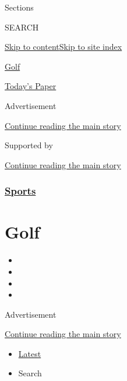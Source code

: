 Sections

SEARCH

\protect\hyperlink{site-content}{Skip to
content}\protect\hyperlink{site-index}{Skip to site index}

\href{https://www.nytimes3xbfgragh.onion/section/sports/golf}{Golf}

\href{https://myaccount.nytimes3xbfgragh.onion/auth/login?response_type=cookie\&client_id=vi}{}

\href{https://www.nytimes3xbfgragh.onion/section/todayspaper}{Today's
Paper}

Advertisement

\protect\hyperlink{after-top}{Continue reading the main story}

Supported by

\protect\hyperlink{after-sponsor}{Continue reading the main story}

\hypertarget{sports}{%
\subsubsection{\texorpdfstring{\href{/section/sports}{Sports}}{Sports}}\label{sports}}

\hypertarget{golf}{%
\section{Golf}\label{golf}}

\begin{itemize}
\item
\item
\item
\item
\end{itemize}

Advertisement

\protect\hyperlink{after-subheader}{Continue reading the main story}

\begin{itemize}
\tightlist
\item
  \protect\hyperlink{stream-panel}{Latest}
\item
  Search
\end{itemize}

